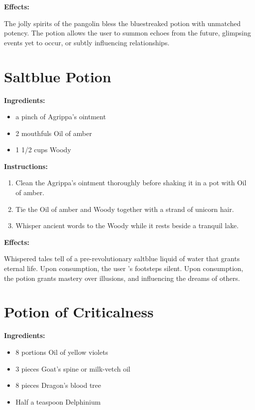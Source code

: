 \documentclass{article}
\begin{document}
\textbf{Effects:}

The jolly spirits of the pangolin bless the bluestreaked potion with unmatched potency. The potion allows the user to summon echoes from the future, glimpsing events yet to occur, or subtly influencing relationships.

\newpage
\section*{Saltblue Potion}

\textbf{Ingredients:}

\begin{itemize}
  \item a pinch of Agrippa's ointment
  \item 2 mouthfuls Oil of amber
  \item 1 1/2 cups Woody
\end{itemize}

\textbf{Instructions:}

\begin{enumerate}
  \item Clean the Agrippa's ointment thoroughly before shaking it in a pot with Oil of amber.
  \item Tie the Oil of amber and Woody together with a strand of unicorn hair.
  \item Whisper ancient words to the Woody while it rests beside a tranquil lake.
\end{enumerate}

\textbf{Effects:}

Whispered tales tell of a pre-revolutionary saltblue liquid of water that grants eternal life. Upon consumption, the user 's footsteps silent. Upon consumption, the potion grants mastery over illusions, and influencing the dreams of others.

\newpage
\section*{Potion of Criticalness}

\textbf{Ingredients:}

\begin{itemize}
  \item 8 portions Oil of yellow violets
  \item 3 pieces Goat's spine or milk-vetch oil
  \item 8 pieces Dragon's blood tree
  \item Half a teaspoon Delphinium
\end{itemize}
\end{document}
